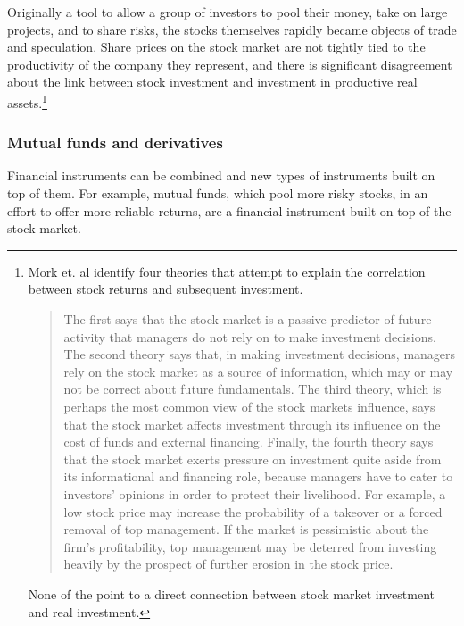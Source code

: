 Originally a tool to allow a group of investors to pool their money, take on large projects, and to share risks, the stocks themselves rapidly became objects of trade and speculation. Share prices on the stock market are not tightly tied to the productivity of the company they represent, %
and there is significant disagreement about the link between stock investment and investment in productive real assets.\footnote{Mork et. al \cite{morckStockMarketInvestment1990} identify four theories that attempt to explain the correlation between stock returns and subsequent investment. \begin{quotation}The first says that the stock market is a passive predictor of future activity that managers do not rely on to make investment decisions. The second theory says that, in making investment decisions, managers rely on the stock market as a source of information, which may or may not be correct about future fundamentals. The third theory, which is perhaps the most common view of the stock markets influence, says that the stock market affects investment through its influence on the cost of funds and external financing. Finally, the fourth theory says that the stock market exerts pressure on investment quite aside from its informational and financing role, because managers have to cater to investors' opinions in order to protect their livelihood. For example, a low stock price may increase the probability of a takeover or a forced removal of top management. If the market is pessimistic about the firm's profitability, top management may be deterred from investing heavily by the prospect of further erosion in the stock price.\end{quotation} None of the point to a direct connection between stock market investment and real investment.}

\subsubsection{Mutual funds and derivatives}
Financial instruments can be combined and new types of instruments built on top of them. For example,
mutual funds, which pool more risky stocks, in an effort to offer more reliable returns, are a financial instrument built on top of the stock market.

